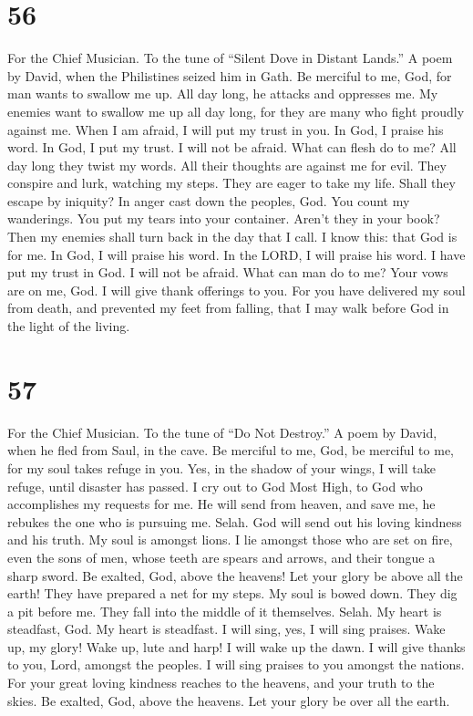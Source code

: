 \hypertarget{section-54}{%
\section{56}\label{section-54}}

For the Chief Musician. To the tune of ``Silent Dove in Distant Lands.''
A poem by David, when the Philistines seized him in Gath. 
Be merciful to me, God, for man wants to swallow me up. All day long, he
attacks and oppresses me.  My enemies want to swallow me up
all day long, for they are many who fight proudly against me.
 When I am afraid, I will put my trust in you. 
In God, I praise his word. In God, I put my trust. I will not be afraid.
What can flesh do to me?  All day long they twist my words.
All their thoughts are against me for evil.  They conspire
and lurk, watching my steps. They are eager to take my life.
 Shall they escape by iniquity? In anger cast down the
peoples, God.  You count my wanderings. You put my tears
into your container. Aren't they in your book?  Then my
enemies shall turn back in the day that I call. I know this: that God is
for me.  In God, I will praise his word. In the LORD, I
will praise his word.  I have put my trust in God. I will
not be afraid. What can man do to me?  Your vows are on me,
God. I will give thank offerings to you.  For you have
delivered my soul from death, and prevented my feet from falling, that I
may walk before God in the light of the living.

\hypertarget{section-55}{%
\section{57}\label{section-55}}

For the Chief Musician. To the tune of ``Do Not Destroy.'' A poem by
David, when he fled from Saul, in the cave.  Be merciful to
me, God, be merciful to me, for my soul takes refuge in you. Yes, in the
shadow of your wings, I will take refuge, until disaster has passed.
 I cry out to God Most High, to God who accomplishes my
requests for me.  He will send from heaven, and save me, he
rebukes the one who is pursuing me. Selah. God will send out his loving
kindness and his truth.  My soul is amongst lions. I lie
amongst those who are set on fire, even the sons of men, whose teeth are
spears and arrows, and their tongue a sharp sword.  Be
exalted, God, above the heavens! Let your glory be above all the earth!
 They have prepared a net for my steps. My soul is bowed
down. They dig a pit before me. They fall into the middle of it
themselves. Selah.  My heart is steadfast, God. My heart is
steadfast. I will sing, yes, I will sing praises.  Wake up,
my glory! Wake up, lute and harp! I will wake up the dawn. 
I will give thanks to you, Lord, amongst the peoples. I will sing
praises to you amongst the nations.  For your great loving
kindness reaches to the heavens, and your truth to the skies.
 Be exalted, God, above the heavens. Let your glory be over
all the earth.

